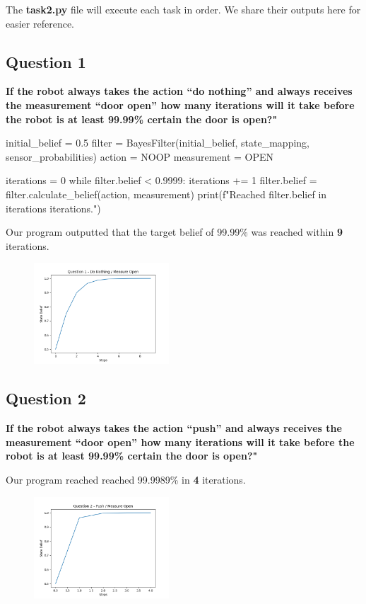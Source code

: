 \documentclass{article}
\begin{document}
The \textbf{task2.py} file will execute each task in order. We share their outputs here for easier reference.

\subsection*{Question 1}

\textbf{If the robot always takes the action “do nothing” and always receives the measurement “door open” how many iterations will it take before the robot is at least 99.99\% certain the door is open?"}

\begin{python}
    initial_belief = 0.5
    filter = BayesFilter(initial_belief, state_mapping, sensor_probabilities)
    action = NOOP
    measurement = OPEN

    iterations = 0
    while filter.belief < 0.9999:
    iterations += 1
    filter.belief = filter.calculate_belief(action, measurement)
    print(f"Reached {filter.belief} in {iterations} iterations.")
\end{python}

Our program outputted that the target belief of 99.99\% was reached within \textbf{9} iterations.


\begin{figure}[H]
    \centering
    \includegraphics[width = 0.45\textwidth]{q1.png}
\end{figure}

\subsection*{Question 2}
\textbf{If the robot always takes the action “push” and always receives the measurement “door open” how many iterations will it take before the robot is at least 99.99\% certain the door is open?"}


Our program reached reached 99.9989\% in \textbf{4} iterations.

\begin{figure}[H]
    \centering
    \includegraphics[width = 0.45\textwidth]{q2.png}
\end{figure}
\end{document}
